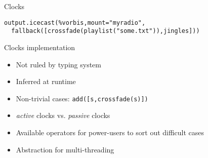 \documentclass{beamer}
\begin{document}
\begin{frame}[fragile]{Clocks}

\begin{lstlisting}
output.icecast(%vorbis,mount="myradio",
  fallback([crossfade(playlist("some.txt")),jingles]))
\end{lstlisting}


\end{frame}

\begin{frame}[fragile]{Clocks implementation}
 \begin{itemize}
  \item<2-> Not ruled by typing system
  \item<3-> Inferred at runtime
  \item<4-> Non-trivial cases: \texttt{add([s,crossfade(s)])}
  \item<5-> \textit{active} clocks vs. \textit{passive} clocks
  \item<6-> Available operators for power-users to sort out difficult cases
  \item<7-> Abstraction for multi-threading
 \end{itemize}

\end{frame}


\end{document}
